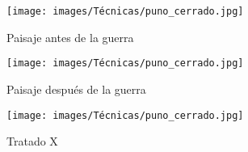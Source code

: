 \begin{figure}[h]
	\centering
	\begin{minipage}{0.3\textwidth}
		\texttt{[image: images/Técnicas/puno\_cerrado.jpg]}
		\caption{Paisaje antes de la guerra}
		\label{fig:figura1}
	\end{minipage}
	\hfill
	\begin{minipage}{0.3\textwidth}
		\texttt{[image: images/Técnicas/puno\_cerrado.jpg]}
		\caption{Paisaje después de la guerra}
		\label{fig:figura2}
	\end{minipage}
	\hfill
	\begin{minipage}{0.3\textwidth}
		\texttt{[image: images/Técnicas/puno\_cerrado.jpg]}
		\caption{Tratado X}
		\label{fig:figura3}
	\end{minipage}
\end{figure}









